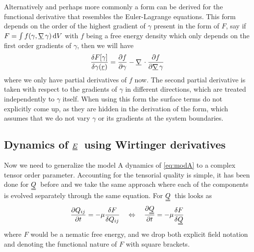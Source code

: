 \documentclass[12pt]{article}
\newcommand{\suf}[2]{\stackunder[0.5pt]{\stackunder[1pt]{\ensuremath{#1}}{\rule{\widthof{\ensuremath{#2}}*\real{0.9}}{.1ex}}}{}}
\newcommand{\duf}[2]{\stackunder[0.5pt]{\stackunder[0.8pt]{\stackunder[1pt]{\ensuremath{#1}}{\rule{\widthof{\ensuremath{#2}}*\real{0.9}}{.1ex}}}{\rule{\widthof{\ensuremath{#2}}*\real{0.9}}{.1ex}}}{}}
\newcommand{\su}[1]{\suf{#1}{#1}}
\newcommand{\du}[1]{\duf{#1}{#1}}
\newcommand{\mgrad}{\ensuremath{\suf{\nabla}{K}\,}}
\newcommand{\QQ}{\ensuremath{\du{Q}}}
\newcommand{\EE}{\ensuremath{\du{E}}}
\begin{document}
        Alternatively and perhaps more commonly a form can be derived for the functional derivative that resembles the Euler-Lagrange equations.
        This form depends on the order of the highest gradient of $\gamma$ present in the form of $F$, say if $F = \int f(\gamma, \mgrad \gamma) \dd{V}$ with $f$ being a free energy density which only depends on the first order gradients of $\gamma$, then we will have
        \begin{equation}
            \fdv{F[\gamma]}{\gamma(\su{r})} = \pdv{f}{\gamma} - \mgrad \cdot \pdv{f}{\mgrad \gamma}
        \end{equation}
        where we only have partial derivatives of $f$ now.
        The second partial derivative is taken with respect to the gradients of $\gamma$ in different directions, which are treated independently to $\gamma$ itself.
        When using this form the surface terms do not explicitly come up, as they are hidden in the derivation of the form, which assumes that we do not vary $\gamma$ or its gradients at the system boundaries.

    \subsection{Dynamics of \EE\ using Wirtinger derivatives}
        Now we need to generalize the model A dynamics of \cref{eq:modA} to a complex tensor order parameter.
        Accounting for the tensorial quality is simple, it has been done for \QQ\ before and we take the same approach where each of the components is evolved separately through the same equation.
        For \QQ\ this looks as
        \begin{equation}
            \pdv{Q_{ij}}{t} = -\mu \fdv{F}{Q_{ij}} \quad\Leftrightarrow\quad \pdv{\du{Q}}{t} = -\mu\fdv{F}{\du{Q}}
        \end{equation}
        where $F$ would be a nematic free energy, and we drop both explicit field notation and denoting the functional nature of $F$ with square brackets.
\end{document}
